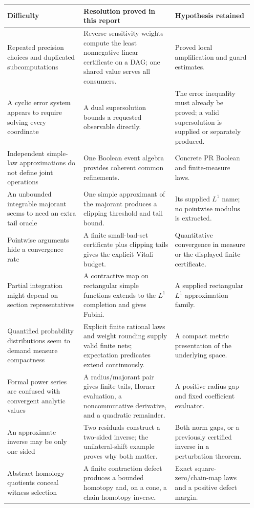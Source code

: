 \begin{longtable}{@{}P{.25\textwidth}P{.37\textwidth}P{.31\textwidth}@{}}
\toprule Difficulty & Resolution proved in this report & Hypothesis retained\\\midrule\endhead
Repeated precision choices and duplicated subcomputations & Reverse sensitivity weights compute the least nonnegative linear certificate on a DAG; one shared value serves all consumers. & Proved local amplification and guard estimates.\\
A cyclic error system appears to require solving every coordinate & A dual supersolution bounds a requested observable directly. & The error inequality must already be proved; a valid supersolution is supplied or separately produced.\\
Independent simple-law approximations do not define joint operations & One Boolean event algebra provides coherent common refinements. & Concrete PR Boolean and finite-measure laws.\\
An unbounded integrable majorant seems to need an extra tail oracle & One simple approximant of the majorant produces a clipping threshold and tail bound. & Its supplied $L^1$ name; no pointwise modulus is extracted.\\
Pointwise arguments hide a convergence rate & A finite small-bad-set certificate plus clipping tails gives the explicit Vitali budget. & Quantitative convergence in measure or the displayed finite certificate.\\
Partial integration might depend on section representatives & A contractive map on rectangular simple functions extends to the $L^1$ completion and gives Fubini. & A supplied rectangular $L^1$ approximation family.\\
Quantified probability distributions seem to demand measure compactness & Explicit finite rational laws and weight rounding supply valid finite nets; expectation predicates extend continuously. & A compact metric presentation of the underlying space.\\
Formal power series are confused with convergent analytic values & A radius/majorant pair gives finite tails, Horner evaluation, a noncommutative derivative, and a quadratic remainder. & A positive radius gap and fixed coefficient evaluator.\\
An approximate inverse may be only one-sided & Two residuals construct a two-sided inverse; the unilateral-shift example proves why both matter. & Both norm gaps, or a previously certified inverse in a perturbation theorem.\\
Abstract homology quotients conceal witness selection & A finite contraction defect produces a bounded homotopy and, on a cone, a chain-homotopy inverse. & Exact square-zero/chain-map laws and a positive defect margin.\\
\bottomrule
\end{longtable}

